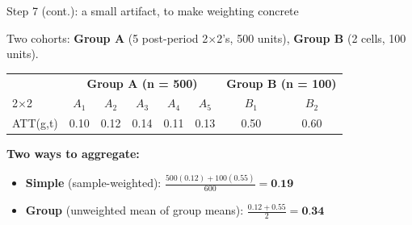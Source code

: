 \documentclass[aspectratio=169,12pt,t]{beamer}
\begin{document}
\begin{frame}{Step 7 (cont.): a small artifact, to make weighting concrete}
\vspace{0.15cm}

Two cohorts: \;\textbf{Group A} (5 post-period 2$\times$2's, 500 units), \;\textbf{Group B} (2 cells, 100 units).

\vspace{0.2cm}

\begin{center}
\scriptsize
\setlength{\tabcolsep}{8pt}
\renewcommand{\arraystretch}{1.05}
\begin{tabular}{l|ccccc|cc}
\toprule
                  & \multicolumn{5}{c|}{\textbf{Group A (n = 500)}} & \multicolumn{2}{c}{\textbf{Group B (n = 100)}} \\
2$\times$2        & $A_1$ & $A_2$ & $A_3$ & $A_4$ & $A_5$        & $B_1$ & $B_2$ \\
\midrule
ATT(g,t)          & 0.10 & 0.12 & 0.14 & 0.11 & 0.13           & 0.50 & 0.60 \\
\bottomrule
\end{tabular}
\end{center}

\vspace{0.3cm}

\textbf{Two ways to aggregate:}
\begin{itemize}\small\setlength\itemsep{0pt}
  \item \textbf{Simple} (sample-weighted): \;$\frac{500(0.12) + 100(0.55)}{600} = \textbf{0.19}$
  \item \textbf{Group} (unweighted mean of group means): \;$\frac{0.12 + 0.55}{2} = \textbf{0.34}$
\end{itemize}

\vspace{0.15em}
\end{frame}

\end{document}
